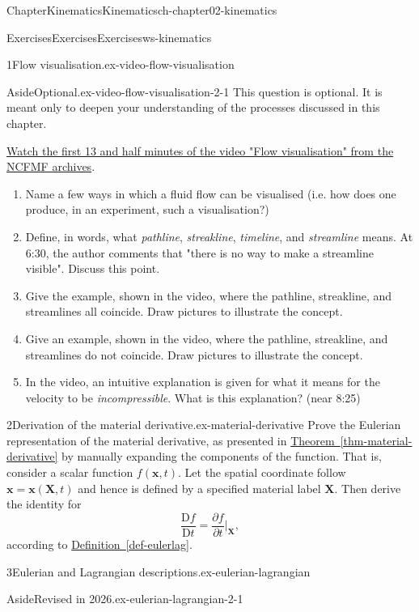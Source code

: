 \documentclass[oneside,10pt,]{book}
\newcommand{\xreffont}{\relax}
\numberwithin{equation}{section}
\newcommand{\DD}[2]{\frac{\mathrm{D}#1}{\mathrm{D}#2}}
\newcommand{\pd}[2]{\frac{\partial#1}{\partial#2}}
\newcommand{\bx}{\boldsymbol{x}}
\newcommand{\bX}{\boldsymbol{X}}
\begin{document}
\begin{chapterptx}{Chapter}{Kinematics}{}{Kinematics}{}{}{ch-chapter02-kinematics}
\begin{exercises-section}{Exercises}{Exercises}{}{Exercises}{}{}{ws-kinematics}
\begin{divisionexercise}{1}{Flow visualisation.}{}{ex-video-flow-visualisation}
\begin{aside}{Aside}{Optional.}{ex-video-flow-visualisation-2-1}
This question is optional. It is meant only to deepen your understanding of the processes discussed in this chapter.%
\end{aside}
 \href{https://techtv.mit.edu/collections/ifluids/videos/32598-flow-visualization}{Watch the first 13 and half minutes of the video "Flow visualisation" from the NCFMF archives}.%
\begin{enumerate}[font=\bfseries,label=(\alph*),ref=\alph*]%
\item{}Name a few ways in which a fluid flow can be visualised (i.e. how does one produce, in an experiment, such a visualisation?)%
\item{}Define, in words, what \emph{pathline}, \emph{streakline}, \emph{timeline}, and \emph{streamline} means. At 6:30, the author comments that "there is no way to make a streamline visible". Discuss this point.%
\item{}Give the example, shown in the video, where the pathline, streakline, and streamlines all coincide. Draw pictures to illustrate the concept.%
\item{}Give an example, shown in the video, where the pathline, streakline, and streamlines do not coincide. Draw pictures to illustrate the concept.%
\item{}In the video, an intuitive explanation is given for what it means for the velocity to be \emph{incompressible}. What is this explanation? (near 8:25)%
\end{enumerate}%
\end{divisionexercise}%
\begin{divisionexercise}{2}{Derivation of the material derivative.}{}{ex-material-derivative}%
Prove the Eulerian representation of the material derivative, as presented in \hyperref[thm-material-derivative]{Theorem~{\xreffont\ref{thm-material-derivative}}} by manually expanding the components of the function. That is, consider a scalar function \(f(\bx, t)\). Let the spatial coordinate follow \(\bx
= \bx(\bX,t)\) and hence is defined by a specified material label \(\bX\). Then derive the identity for%
\begin{equation*}
\DD{f}{t} = \pd{f}{t} \biggr\rvert_{\bX},
\end{equation*}
according to \hyperref[def-eulerlag]{Definition~{\xreffont\ref{def-eulerlag}}}.%
\end{divisionexercise}%
\begin{divisionexercise}{3}{Eulerian and Lagrangian descriptions.}{}{ex-eulerian-lagrangian}%
\begin{aside}{Aside}{Revised in 2026.}{ex-eulerian-lagrangian-2-1}%

\end{aside}
\end{divisionexercise}
\end{exercises-section}
\end{chapterptx}
\end{document}
